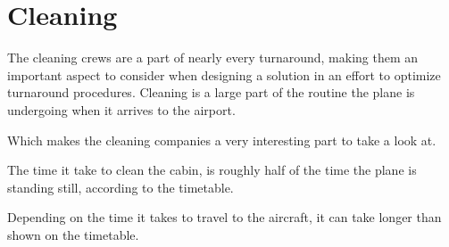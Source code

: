 \section{Cleaning}
The cleaning crews are a part of nearly every turnaround, making them an important aspect to consider when designing a solution in an effort to optimize turnaround procedures.
Cleaning is a large part of the routine the plane is undergoing when it arrives to the airport.

Which makes the cleaning companies a very interesting part to take a look at.

The time it take to clean the cabin, is roughly half of the time the plane is standing still, according to the timetable.

Depending on the time it takes to travel to the aircraft, it can take longer than shown on the timetable.





